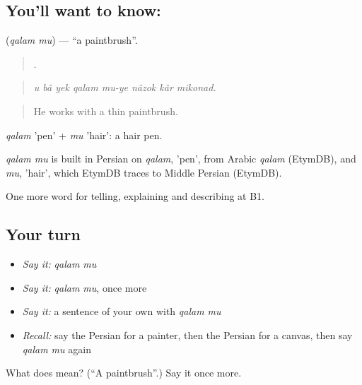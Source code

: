 \subsection*{You'll want to know:  }
\textbf{ } (\emph{qalam mu}) — \textquotedblleft{}a paintbrush\textquotedblright{}.

\begin{quote}
       .
\end{quote}

\begin{quote}
\emph{u bâ yek qalam mu-ye nâzok kâr mikonad.}
\end{quote}

\begin{quote}
He works with a thin paintbrush.
\end{quote}

\emph{qalam} 'pen' + \emph{mu} 'hair': a hair pen.

\begin{cousinweb}
\emph{qalam mu} is built in Persian on \emph{qalam}, 'pen', from Arabic \emph{qalam} (EtymDB), and \emph{mu}, 'hair', which EtymDB traces to Middle Persian (EtymDB).
\end{cousinweb}

\begin{grammarlens}[title={What you've built}]
One more word for telling, explaining and describing at B1.
\end{grammarlens}

\subsection*{Your turn}
\begin{itemize}
\raggedright
  \item \emph{Say it:} \emph{qalam mu}
  \item \emph{Say it:} \emph{qalam mu}, once more
  \item \emph{Say it:} a sentence of your own with \emph{qalam mu}
  \item \emph{Recall:} say the Persian for a painter, then the Persian for a canvas, then say \emph{qalam mu} again
\end{itemize}

\begin{tcolorbox}[breakable,colback=teal!4,colframe=teal!35!black,title={Before you move on}]
What does   mean? (\textquotedblleft{}A paintbrush\textquotedblright{}.) Say it once more.
\end{tcolorbox}
